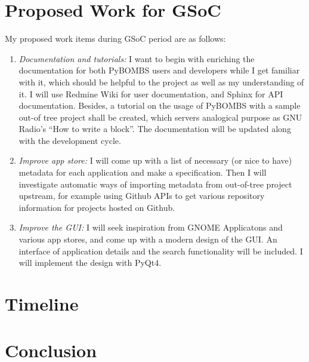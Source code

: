 \documentclass[a4paper]{article}
\begin{document}
\section{Proposed Work for GSoC}

My proposed work items during GSoC period are as follows:

\begin{enumerate}
  \item \emph{Documentation and tutorials:} I want to begin with
    enriching the documentation for both PyBOMBS users and developers
    while I get familiar with it, which should be helpful to the
    project as well as my understanding of it. I will use Redmine Wiki
    for user documentation, and Sphinx for API documentation.
    Besides, a tutorial on the usage of PyBOMBS with a sample out-of\-
    tree project shall be created, which servers analogical purpose as
    GNU Radio's ``How to write a block''. The documentation will be
    updated along with the development cycle.
  \item \emph{Improve app store:} I will come up with a list of
    necessary (or nice to have) metadata for each application and make a
    specification. Then I will investigate automatic ways of importing
    metadata from out-of-tree project upstream, for example using Github
    APIs to get various repository information for projects hosted on
    Github.
  \item \emph{Improve the GUI:} I will seek inspiration from GNOME
    Applicatons and various app stores, and come up with a modern design
    of the GUI. An interface of application details and the search
    functionality will be included. I will implement the design with
    PyQt4.
\end{enumerate}

\section{Timeline}
\section{Conclusion}
\end{document}
